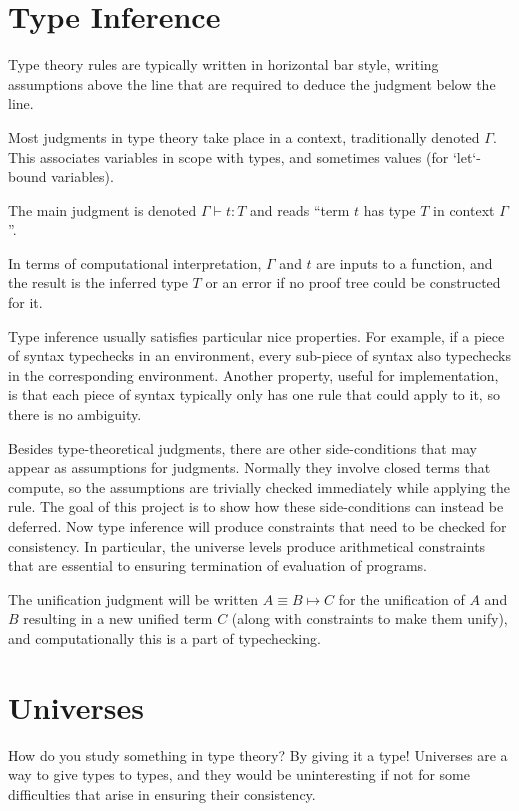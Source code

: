\documentclass[11pt, twoside, reqno]{book}
\begin{document}
\chapter{Type Inference}
\label{type-inf}

Type theory rules are typically written in horizontal bar style, writing assumptions above the line that are required to deduce the judgment below the line.

Most judgments in type theory take place in a context, traditionally denoted $\Gamma$.
This associates variables in scope with types, and sometimes values (for \inHS`let`-bound variables).

The main judgment is denoted $\Gamma \vdash t : T$ and reads ``term $t$ has type $T$ in context $\Gamma$''.

In terms of computational interpretation, $\Gamma$ and $t$ are inputs to a function, and the result is the inferred type $T$ or an error if no proof tree could be constructed for it.

Type inference usually satisfies particular nice properties.
For example, if a piece of syntax typechecks in an environment, every sub-piece of syntax also typechecks in the corresponding environment.
Another property, useful for implementation, is that each piece of syntax typically only has one rule that could apply to it, so there is no ambiguity.

Besides type-theoretical judgments, there are other side-conditions that may appear as assumptions for judgments.
Normally they involve closed terms that compute, so the assumptions are trivially checked immediately while applying the rule.
The goal of this project is to show how these side-conditions can instead be deferred.
Now type inference will produce constraints that need to be checked for consistency.
In particular, the universe levels produce arithmetical constraints that are essential to ensuring termination of evaluation of programs.

The unification judgment will be written $A \equiv B \mapsto C$ for the unification of $A$ and $B$ resulting in a new unified term $C$ (along with constraints to make them unify), and computationally this is a part of typechecking.

\chapter{Universes}
\label{universes}

How do you study something in type theory?
By giving it a type!
Universes are a way to give types to types, and they would be uninteresting if not for some difficulties that arise in ensuring their consistency.
\end{document}
